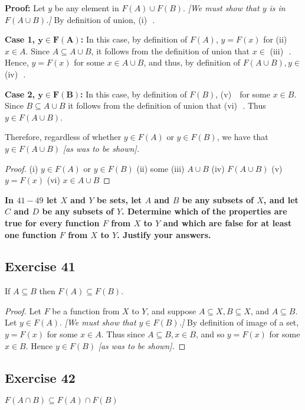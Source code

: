 \documentclass[14pt]{extarticle}
\newcommand{\fbl}{\underline{\hspace{1cm}}\,\,}
\newcommand{\cy}{\color{cyan}}
\begin{document}
    {\bf Proof:} Let $y$ be any element in \(F(A) \cup F(B)\). {\it [We must show that $y$ is in \(F(A \cup B)\).]} By
definition of union, {\cy (i) \fbl.}

    {\bf Case 1, \(\bm{y \in F(A)}\):} In this case, by definition of $F(A)$, \(y = F(x)\) for {\cy (ii) \fbl}
\(x \in A\). Since \(A \subseteq A \cup B\), it follows from the definition of union that \(x \in\) {\cy (iii)
        \fbl.} Hence, \(y = F(x)\) for some \(x \in A \cup B\), and thus, by definition of \(F(A \cup B), y \in\) {\cy (iv) \fbl.}

    {\bf Case 2, \(\bm{y \in F(B)}\):} In this case, by definition of $F(B)$, {\cy (v) \fbl} for some $x \in B$.
Since \(B \subseteq A \cup B\) it follows from the definition of union that {\cy (vi) \fbl.}
Thus \(y \in F(A \cup B)\).

Therefore, regardless of whether \(y \in F(A)\) or \(y \in F(B)\), we have that \(y \in F(A \cup B)\) {\it [as was to be shown].}

\begin{proof}
    (i) \(y \in F(A)\) or \(y \in F(B)\) (ii) some (iii) \(A \cup B\) (iv) \(F(A \cup B)\) (v) \(y = F(x)\) (vi) \(x \in A \cup B\)
\end{proof}

{\bf \cy In $41-49$ let $X$ and $Y$ be sets, let $A$ and $B$ be any subsets of $X$, and let $C$ and $D$ be any
subsets of $Y$. Determine which of the properties are true for every function $F$ from $X$ to $Y$ and which are false
for at least one function $F$ from $X$ to $Y$. Justify your answers.}

\subsection{Exercise 41}
If \(A \subseteq B\) then \(F(A) \subseteq F(B)\).

\begin{proof}
    Let $F$ be a function from $X$ to $Y$, and suppose \(A \subseteq X, B \subseteq X\), and \(A \subseteq B\).
    Let \(y \in F(A)\). {\it [We must show that \(y \in F(B)\).]} By definition of image of a set, \(y = F(x)\) for
    some \(x \in A\). Thus since \(A \subseteq B, x \in B\), and so \(y = F(x)\) for some \(x \in B\).
    Hence \(y \in F(B)\) {\it [as was to be shown].}
\end{proof}

\subsection{Exercise 42}
\(F(A \cap B) \subseteq F(A) \cap F(B)\)
\end{document}
